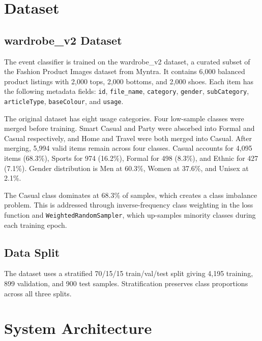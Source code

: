 \documentclass[conference]{IEEEtran}
\begin{document}
\section{Dataset}

\subsection{wardrobe\_v2 Dataset}

The event classifier is trained on the wardrobe\_v2 dataset, a curated subset of the Fashion Product Images dataset \cite{b6} from Myntra. It contains 6,000 balanced product listings with 2,000 tops, 2,000 bottoms, and 2,000 shoes. Each item has the following metadata fields: \texttt{id}, \texttt{file\_name}, \texttt{category}, \texttt{gender}, \texttt{subCategory}, \texttt{articleType}, \texttt{baseColour}, and \texttt{usage}.

The original dataset has eight usage categories. Four low-sample classes were merged before training. Smart Casual and Party were absorbed into Formal and Casual respectively, and Home and Travel were both merged into Casual. After merging, 5,994 valid items remain across four classes. Casual accounts for 4,095 items (68.3\%), Sports for 974 (16.2\%), Formal for 498 (8.3\%), and Ethnic for 427 (7.1\%). Gender distribution is Men at 60.3\%, Women at 37.6\%, and Unisex at 2.1\%.

The Casual class dominates at 68.3\% of samples, which creates a class imbalance problem. This is addressed through inverse-frequency class weighting in the loss function and \texttt{WeightedRandomSampler}, which up-samples minority classes during each training epoch.

\subsection{Data Split}

The dataset uses a stratified 70/15/15 train/val/test split giving 4,195 training, 899 validation, and 900 test samples. Stratification preserves class proportions across all three splits.

\section{System Architecture}
\end{document}
